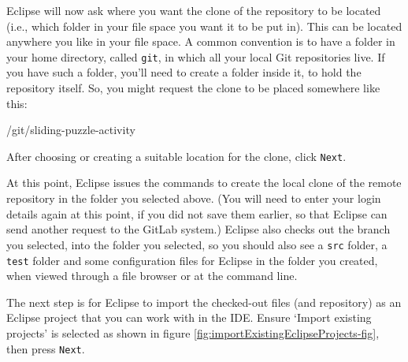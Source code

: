 \documentclass[
]{book}
\newenvironment{Shaded}{\begin{snugshade}}{\end{snugshade}}
\newcommand{\NormalTok}[1]{#1}
\begin{document}
Eclipse will now ask where you want the clone of the repository to be located (i.e., which folder in your file space you want it to be put in). This can be located anywhere you like in your file space. A common convention is to have a folder in your home directory, called \texttt{git}, in which all your local Git repositories live. If you have such a folder, you'll need to create a folder inside it, to hold the repository itself. So, you might request the clone to be placed somewhere like this:

\begin{Shaded}
\begin{Highlighting}[]
\NormalTok{/git/sliding{-}puzzle{-}activity}
\end{Highlighting}
\end{Shaded}

After choosing or creating a suitable location for the clone, click \texttt{Next}.

At this point, Eclipse issues the commands to create the local clone of the remote repository in the folder you selected above. (You will need to enter your login details again at this point, if you did not save them earlier, so that Eclipse can send another request to the GitLab system.) Eclipse also checks out the branch you selected, into the folder you selected, so you should also see a \texttt{src} folder, a \texttt{test} folder and some configuration files for Eclipse in the folder you created, when viewed through a file browser or at the command line.

The next step is for Eclipse to import the checked-out files (and repository) as an Eclipse project that you can work with in the IDE. Ensure `Import existing projects' is selected as shown in figure \ref{fig:importExistingEclipseProjects-fig}, then press \texttt{Next}.
\end{document}
